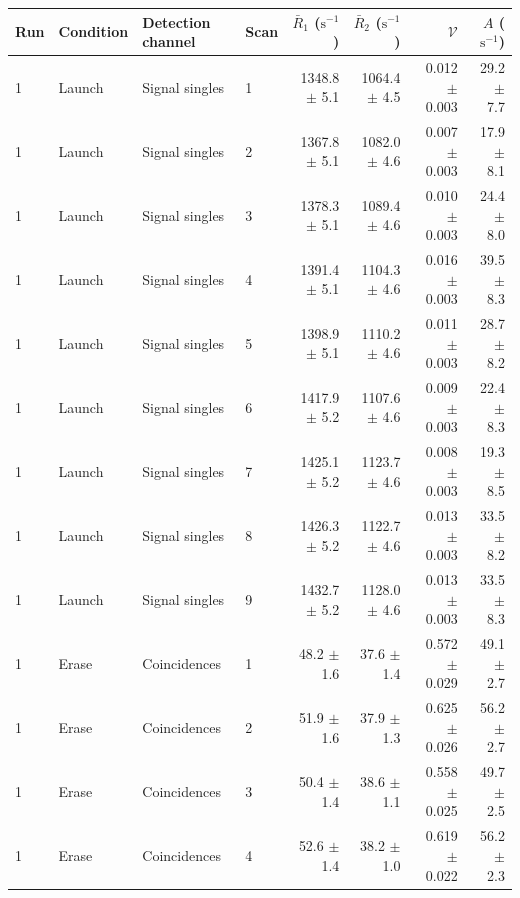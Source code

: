 \begin{tabular}{llllrrrr}
\toprule
Run & Condition & Detection channel & Scan & $\bar R_1$ ($\mathrm{s}^{-1}$) & $\bar R_2$ ($\mathrm{s}^{-1}$) & $\mathcal{V}$ & $A$ ($\mathrm{s}^{-1}$) \\
\midrule
1 & Launch & Signal singles & 1 & 1348.8 \ensuremath{\pm} 5.1 & 1064.4 \ensuremath{\pm} 4.5 & 0.012 \ensuremath{\pm} 0.003 & 29.2 \ensuremath{\pm} 7.7 \\
1 & Launch & Signal singles & 2 & 1367.8 \ensuremath{\pm} 5.1 & 1082.0 \ensuremath{\pm} 4.6 & 0.007 \ensuremath{\pm} 0.003 & 17.9 \ensuremath{\pm} 8.1 \\
1 & Launch & Signal singles & 3 & 1378.3 \ensuremath{\pm} 5.1 & 1089.4 \ensuremath{\pm} 4.6 & 0.010 \ensuremath{\pm} 0.003 & 24.4 \ensuremath{\pm} 8.0 \\
1 & Launch & Signal singles & 4 & 1391.4 \ensuremath{\pm} 5.1 & 1104.3 \ensuremath{\pm} 4.6 & 0.016 \ensuremath{\pm} 0.003 & 39.5 \ensuremath{\pm} 8.3 \\
1 & Launch & Signal singles & 5 & 1398.9 \ensuremath{\pm} 5.1 & 1110.2 \ensuremath{\pm} 4.6 & 0.011 \ensuremath{\pm} 0.003 & 28.7 \ensuremath{\pm} 8.2 \\
1 & Launch & Signal singles & 6 & 1417.9 \ensuremath{\pm} 5.2 & 1107.6 \ensuremath{\pm} 4.6 & 0.009 \ensuremath{\pm} 0.003 & 22.4 \ensuremath{\pm} 8.3 \\
1 & Launch & Signal singles & 7 & 1425.1 \ensuremath{\pm} 5.2 & 1123.7 \ensuremath{\pm} 4.6 & 0.008 \ensuremath{\pm} 0.003 & 19.3 \ensuremath{\pm} 8.5 \\
1 & Launch & Signal singles & 8 & 1426.3 \ensuremath{\pm} 5.2 & 1122.7 \ensuremath{\pm} 4.6 & 0.013 \ensuremath{\pm} 0.003 & 33.5 \ensuremath{\pm} 8.2 \\
1 & Launch & Signal singles & 9 & 1432.7 \ensuremath{\pm} 5.2 & 1128.0 \ensuremath{\pm} 4.6 & 0.013 \ensuremath{\pm} 0.003 & 33.5 \ensuremath{\pm} 8.3 \\
\midrule
1 & Erase & Coincidences & 1 & 48.2 \ensuremath{\pm} 1.6 & 37.6 \ensuremath{\pm} 1.4 & 0.572 \ensuremath{\pm} 0.029 & 49.1 \ensuremath{\pm} 2.7 \\
1 & Erase & Coincidences & 2 & 51.9 \ensuremath{\pm} 1.6 & 37.9 \ensuremath{\pm} 1.3 & 0.625 \ensuremath{\pm} 0.026 & 56.2 \ensuremath{\pm} 2.7 \\
1 & Erase & Coincidences & 3 & 50.4 \ensuremath{\pm} 1.4 & 38.6 \ensuremath{\pm} 1.1 & 0.558 \ensuremath{\pm} 0.025 & 49.7 \ensuremath{\pm} 2.5 \\
1 & Erase & Coincidences & 4 & 52.6 \ensuremath{\pm} 1.4 & 38.2 \ensuremath{\pm} 1.0 & 0.619 \ensuremath{\pm} 0.022 & 56.2 \ensuremath{\pm} 2.3 \\

\end{tabular}
